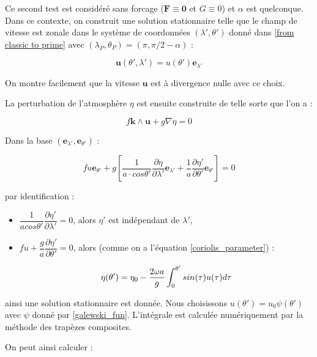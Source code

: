 Ce second test est considéré sans forcage ($\mathbf{F} \equiv \mathbf{0}$ et $G \equiv 0$) et $\alpha$ est quelconque. Dans ce contexte, on construit une solution stationnaire telle que le champ de vitesse est zonale dans le système de coordonnées $(\lambda', \theta')$ donné dans \eqref{from classic to prime} avec $(\lambda_P, \theta_P) = (\pi, \pi /2 - \alpha)$ :

$$\mathbf{u}(\theta', \lambda') = u(\theta') \mathbf{e}_{\lambda'}$$

On montre facilement que la vitesse $ \mathbf{u}$ est à divergence nulle avec ce choix.

La perturbation de l'atmosphère $\eta$ est ensuite construite de telle sorte que l'on a :

\begin{equation}
f \mathbf{k} \wedge \mathbf{u} + g \nabla \eta = 0
\end{equation} 

Dans la base $(\mathbf{e}_{\lambda'}, \mathbf{e}_{\theta'})$ :

\begin{equation}
f u \mathbf{e}_{\theta'} + g \left[ \dfrac{1}{a \cdot cos \theta'} \dfrac{\partial \eta}{\partial \lambda'} \mathbf{e}_{\lambda'} + \dfrac{1}{a}\dfrac{\partial \eta'}{\partial \theta'} \mathbf{e}_{\theta'} \right] = 0
\end{equation}

par identification :

\begin{itemize}
\item $\dfrac{1}{a cos \theta'} \dfrac{\partial \eta'}{\partial \lambda'} = 0$, alors $\eta'$ est indépendant de $\lambda'$,

\item $f u + \dfrac{g}{a} \dfrac{\partial \eta'}{\partial \theta'} = 0$, alors (comme on a l'équation \eqref{coriolis_parameter}) :

\begin{equation}
\eta (\theta' ) = \eta_0 - \dfrac{2 \omega a}{g} \displaystyle\int_0^{\theta'} sin(\tau) u(\tau) d \tau
\end{equation} 
\end{itemize}

ainsi une solution stationnaire est donnée. Nous choisissons $u(\theta') = u_0 \psi( \theta' )$ avec $\psi$ donné par \eqref{galewski_fun}. L'intégrale est calculée numériquement par la méthode des trapèzes composites.

On peut ainsi calculer :

